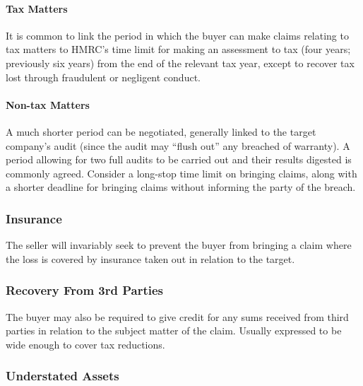 \documentclass[
]{article}
\begin{document}
\hypertarget{tax-matters}{%
\paragraph{Tax Matters}\label{tax-matters}}

It is common to link the period in which the buyer can make claims
relating to tax matters to HMRC's time limit for making an assessment to
tax (four years; previously six years) from the end of the relevant tax
year, except to recover tax lost through fraudulent or negligent
conduct.

\hypertarget{non-tax-matters}{%
\paragraph{Non-tax Matters}\label{non-tax-matters}}

A much shorter period can be negotiated, generally linked to the target
company's audit (since the audit may ``flush out'' any breached of
warranty). A period allowing for two full audits to be carried out and
their results digested is commonly agreed. Consider a long-stop time
limit on bringing claims, along with a shorter deadline for bringing
claims without informing the party of the breach.

\hypertarget{insurance}{%
\subsubsection{Insurance}\label{insurance}}

The seller will invariably seek to prevent the buyer from bringing a
claim where the loss is covered by insurance taken out in relation to
the target.

\hypertarget{recovery-from-3rd-parties}{%
\subsubsection{Recovery From 3rd
Parties}\label{recovery-from-3rd-parties}}

The buyer may also be required to give credit for any sums received from
third parties in relation to the subject matter of the claim. Usually
expressed to be wide enough to cover tax reductions.

\hypertarget{understated-assets}{%
\subsubsection{Understated Assets}\label{understated-assets}}
\end{document}
